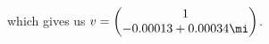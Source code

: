 \documentclass[preview]{standalone}
\begin{document}
\begin{center}
\raggedright
                which gives us \(v = \begin{pmatrix}
                                1 \\
                                -0.00013 + 0.00034\mi
                            \end{pmatrix}\).
\end{center}
\end{document}
